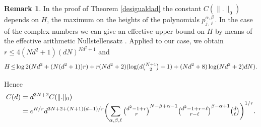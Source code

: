 \documentclass[JEP,XML,SOM,Unicode,NoEqCountersInSection]{cedram}
\theoremstyle{plain}
\theoremstyle{definition}
\newtheorem{obs}[teo]{Remark}
\begin{document}
\begin{obs}\label{effective} In the proof of Theorem \ref{desigualdad} the constant $C(\|.\|_0)$ depends on $H$, the maximum on the heights of the polynomials $p_{j,\ell}^{\alpha,\beta}$. In the case of the complex numbers we can give an effective upper bound on $H$ by means of the effective arithmetic Nullstellensatz \cite[Th.\,1]{klpasom}. Applied to our case, we obtain $r\leq 4(Nd^2+1)(dN)^{Nd^2+1}$ and
\begin{equation*}
H\!\leq\!\log{2}(Nd^2+(N(d^2+1))r)+r(Nd^2+2)(\log(d\tbinom{N+1}{2}+1)+(Nd^2+8)\log(Nd^2+2)dN).
\end{equation*}
\end{obs}
Hence
\begin{equation*}
\begin{split}
C(d)& =d^{3N+2}C(\|.\|_0) \\[-5pt]
& =e^{H/r}d^{3N+2+(N+1)(d-1)/r}\biggl( \sum_{\alpha,\beta,\ell}{{\tbinom{d^2-1+r}{r}}^{{N-\beta+\alpha-1}}{\tbinom{d^2-1+r-\ell}{r-\ell}}^{{\beta-\alpha+1}}\tbinom{d}{\ell}}\biggr)^{1/r}.
\end{split}
\end{equation*}
\end{document}
